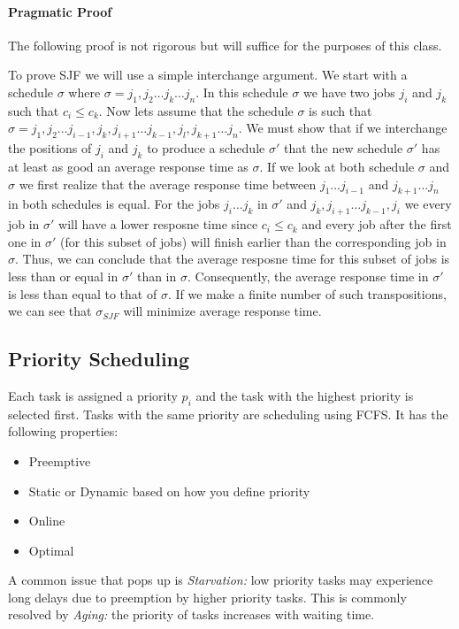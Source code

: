 \documentclass{hw}
\begin{document}
\paragraph{Pragmatic Proof}
The following proof is not rigorous but will suffice for the purposes of this
class.

To prove SJF we will use a simple interchange argument. We start with a
schedule $\sigma$ where $\sigma = {j_1, j_2 \dots j_k \dots j_n}$. In this
schedule $\sigma$ we have two jobs $j_i$ and $j_k$ such that $c_i \leq c_k$.
Now lets assume that the schedule $\sigma$ is such that $\sigma = {j_1, j_2
\dots j_{i-1}, j_k, j_{i+1} \dots j_{k-1}, j_l, j_{k+1} \dots j_n}$. We must
show that if we interchange the positions of $j_i$ and $j_k$ to produce a
schedule $\sigma '$ that the new schedule $\sigma '$ has at least as good an
average response time as $\sigma$. If we look at both schedule $\sigma$ and
$\sigma$ we first realize that the average response time between $j_1 \dots
j_{i-1}$ and $j_{k+1} \dots j_n$ in both schedules is equal. For the jobs $j_i
\dots j_k$ in $\sigma '$ and $j_k, j_{i+1} \dots j_{k-1}, j_i$ we every job in
$\sigma '$ will have a lower resposne time since $c_i \leq c_k$ and every job
after the first one in $\sigma '$ (for this subset of jobs) will finish earlier
than the corresponding job in $\sigma$. Thus, we can conclude that the average
resposne time for this subset of jobs is less than or equal in $\sigma '$ than
in $\sigma$. Consequently, the average response time in $\sigma '$ is less than
equal to that of $\sigma$. If we make a finite number of such transpositions,
we can see that $\sigma_{SJF}$ will minimize average response time.


\subsection{Priority Scheduling}
Each task is assigned a priority $p_{i}$ and the task with the highest priority
is selected first. Tasks with the same priority are scheduling using FCFS\@. It
has the following properties:
\begin{itemize}
  \item Preemptive
  \item Static or Dynamic based on how you define priority
  \item Online
  \item Optimal
\end{itemize}
A common issue that pops up is \emph{Starvation:} low priority tasks may 
experience long delays due to preemption by higher priority tasks. This is 
commonly resolved by \emph{Aging:} the priority of tasks increases with waiting
time.
\end{document}
